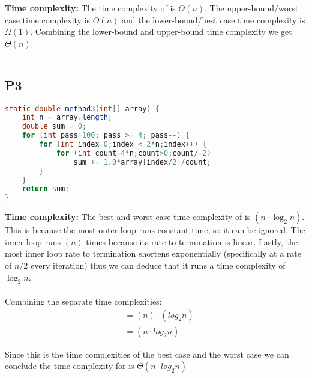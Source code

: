 \textbf{Time complexity:} 
The time complexity of  is $\Theta(n)$. The upper-bound/worst case time complexity is $O(n)$ and the lower-bound/best case time complexity is $\Omega(1)$. Combining the lower-bound and upper-bound time complexity we get $\Theta(n)$. 

\vspace*{16pt}
\hrule

\subsection*{P3}

\begin{lstlisting}[language=Java]
static double method3(int[] array) {
    int n = array.length;
    double sum = 0;
    for (int pass=100; pass >= 4; pass--) {
        for (int index=0;index < 2*n;index++) {
            for (int count=4*n;count>0;count/=2)
                sum += 1.0*array[index/2]/count;
        }
    }
    return sum;
}
\end{lstlisting}
\vspace*{4pt}

\textbf{Time complexity:} 
The best and worst case time complexity of  is $(n\cdot \log_2n)$. This is because the most outer loop runs constant time, so it can be ignored. The inner loop runs $(n)$ times because its rate to termination is linear. Lastly, the most inner loop rate to termination shortens exponentially (specifically at a rate of $n/2$ every iteration) thus we can deduce that it runs a time complexity of $\log_2n$. 
\\\\
Combining the separate time complexities:
\begin{align*}
    &=(n) \cdot (log_2n)\\
    &= (n \cdot log_2n)
\end{align*}

Since this is the time complexities of the best case and the worst case we can conclude the time complexity for  is $\Theta(n \cdot log_2n)$